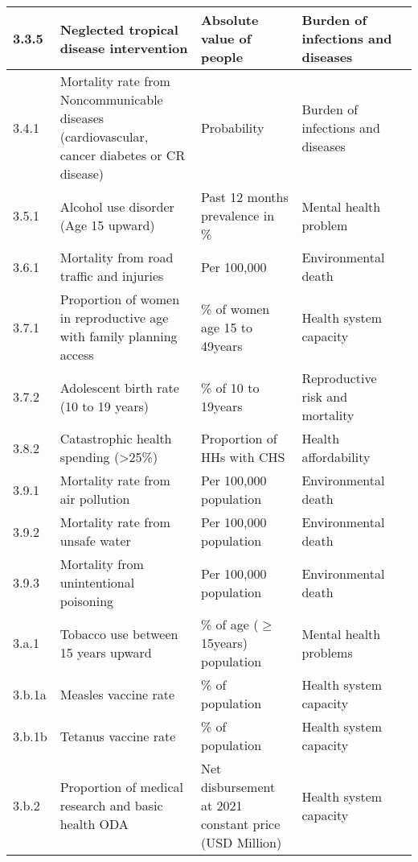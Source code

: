 \begin{sidewaystable}
\begin{tabularx}{\textwidth}{|p{1cm}|p{7.4cm}|p{5.5cm}|p{5.8cm}|p{2.7cm}|}
        \hline
        3.3.5 & Neglected tropical disease intervention & Absolute value of people & Burden of infections and diseases & \textcite{unsdg_sustainable_2023} \\
        \hline
        3.4.1 & Mortality rate from Noncommunicable diseases (cardiovascular, cancer diabetes or CR disease) & Probability & Burden of infections and diseases & \textcite{unsdg_sustainable_2023} \\
        \hline
        3.5.1 & Alcohol use disorder (Age 15 upward) & Past 12 months prevalence in \% & Mental health problem & \textcite{wdi_world_2023} \\
        \hline
        3.6.1 & Mortality from road traffic and injuries & Per 100,000 & Environmental death & \textcite{wdi_world_2023} \\
        \hline
        3.7.1 & Proportion of women in reproductive age with family planning access & \% of women age 15 to 49years & Health system capacity & \textcite{unsdg_sustainable_2023} \\
        \hline
        3.7.2 & Adolescent birth rate (10 to 19 years) & \% of 10 to 19years & Reproductive risk and mortality & \textcite{wdi_world_2023}\\
        \hline
        3.8.2 & Catastrophic health spending (\textgreater 25\%) & Proportion of HHs with CHS & Health affordability & \textcite{wdi_world_2023}\\
        \hline
        3.9.1 & Mortality rate from air pollution & Per 100,000 population & Environmental death & \textcite{wdi_world_2023}\\
        \hline
        3.9.2 & Mortality rate from unsafe water & Per 100,000 population & Environmental death & \textcite{wdi_world_2023}\\
        \hline
        3.9.3 & Mortality from unintentional poisoning & Per 100,000 population & Environmental death & \textcite{wdi_world_2023}\\
        \hline
        3.a.1 & Tobacco use between 15 years upward & \% of age ($\geq$ 15years) population & Mental health problems & \textcite{wdi_world_2023}\\
        \hline
        3.b.1a & Measles vaccine rate & \% of population & Health system capacity & \textcite{unsdg_sustainable_2023}\\
        \hline
        3.b.1b & Tetanus vaccine rate & \% of population & Health system capacity & \textcite{unsdg_sustainable_2023}\\
        \hline
        3.b.2 & Proportion of medical research and basic health ODA & Net disbursement at 2021 constant price (USD Million) & Health system capacity & \textcite{unsdg_sustainable_2023}\\

\end{tabularx}
\end{sidewaystable}
